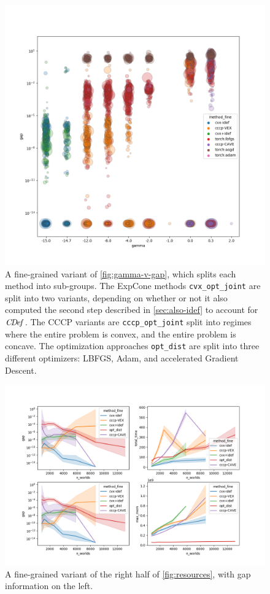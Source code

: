 \documentclass{article}
\begin{document}
\begin{figure}
    \includegraphics[width=\linewidth]{figs/2}
    \caption{
        A fine-grained variant of \cref{fig:gamma-v-gap}, which splits each method into sub-groups.
        The ExpCone methods \texttt{cvx\_opt\_joint} are split into two variants, depending on whether or not it also computed the second step described in \cref{sec:also-idef} to account for $\mathit{C\mskip-3.5muD\mskip-2.5mue\mskip-1.5muf}_{}$.
        The CCCP variants are \texttt{cccp\_opt\_joint} split into regimes where the entire problem is convex, and the entire problem is concave. The optimization approaches \texttt{opt\_dist} are split into three different optimizers: LBFGS, Adam, and accelerated Gradient Descent.
    }\label{fig:gamma-v-gap-fine}
\end{figure}

\begin{figure}
    \includegraphics[width=\linewidth]{figs/1}
    \caption{
        A fine-grained variant of the right half of \cref{fig:resources},
        with gap information on the left.
    }\label{fig:gap-resource-fine}
\end{figure}
\end{document}
